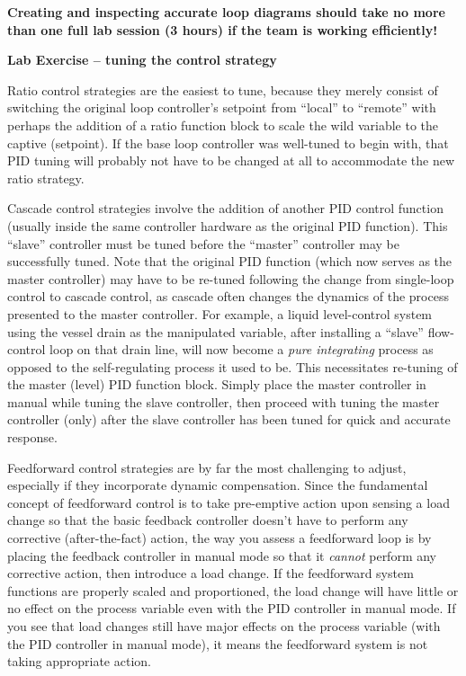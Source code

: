 \vskip 10pt

{\bf Creating and inspecting accurate loop diagrams should take no more than one full lab session (3 hours) if the team is working efficiently!}






\vfil \eject

\noindent
{\bf Lab Exercise -- tuning the control strategy}

\vskip 5pt

Ratio control strategies are the easiest to tune, because they merely consist of switching the original loop controller's setpoint from ``local'' to ``remote'' with perhaps the addition of a ratio function block to scale the wild variable to the captive (setpoint).  If the base loop controller was well-tuned to begin with, that PID tuning will probably not have to be changed at all to accommodate the new ratio strategy.

\vskip 10pt

Cascade control strategies involve the addition of another PID control function (usually inside the same controller hardware as the original PID function).  This ``slave'' controller must be tuned before the ``master'' controller may be successfully tuned.  Note that the original PID function (which now serves as the master controller) may have to be re-tuned following the change from single-loop control to cascade control, as cascade often changes the dynamics of the process presented to the master controller.  For example, a liquid level-control system using the vessel drain as the manipulated variable, after installing a ``slave'' flow-control loop on that drain line, will now become a {\it pure integrating} process as opposed to the self-regulating process it used to be.  This necessitates re-tuning of the master (level) PID function block.  Simply place the master controller in manual while tuning the slave controller, then proceed with tuning the master controller (only) after the slave controller has been tuned for quick and accurate response.

\vskip 10pt

Feedforward control strategies are by far the most challenging to adjust, especially if they incorporate dynamic compensation.  Since the fundamental concept of feedforward control is to take pre-emptive action upon sensing a load change so that the basic feedback controller doesn't have to perform any corrective (after-the-fact) action, the way you assess a feedforward loop is by placing the feedback controller in manual mode so that it {\it cannot} perform any corrective action, then introduce a load change.  If the feedforward system functions are properly scaled and proportioned, the load change will have little or no effect on the process variable even with the PID controller in manual mode.  If you see that load changes still have major effects on the process variable (with the PID controller in manual mode), it means the feedforward system is not taking appropriate action.

